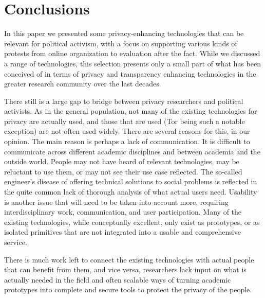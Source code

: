 \section{Conclusions}
\label{Conclusions}

In this paper we presented some privacy-enhancing technologies that can be 
relevant for political activism, with a focus on supporting various kinds of 
protests from online organization to evaluation after the fact. While we 
discussed a range of technologies, this selection presents only a small part of 
what has been conceived of in terms of privacy and transparency enhancing 
technologies in the greater research community over the last decades. 

There 
still is a large gap to bridge between privacy researchers and political 
activists. As in the general population, not many of the existing technologies 
for privacy are actually used, and those that are used (Tor being such 
a notable exception) are not often used widely. There are several reasons for 
this, in our opinion. The main reason is perhaps a lack of communication. It is 
difficult to communicate across different academic disciplines and between 
academia and the outside world. People may not have heard of relevant 
technologies, may be reluctant to use them, or may not see their use case 
reflected. The so-called engineer's disease of offering technical solutions to 
social problems is reflected in the quite common lack of thorough analysis of 
what actual users need. Usability is another issue that will need to be taken 
into account more, requiring interdisciplinary work, communication, and user 
participation. Many of the existing technologies, while conceptually excellent, 
only exist as prototypes, or as isolated primitives that are not integrated 
into a usable and comprehensive service. 

There is much work left to connect the 
existing technologies with actual people that can benefit from them, and vice 
versa, researchers lack input on what is actually needed in the field and often 
scalable ways of turning academic prototypes into complete and secure tools to 
protect the privacy of the people.
